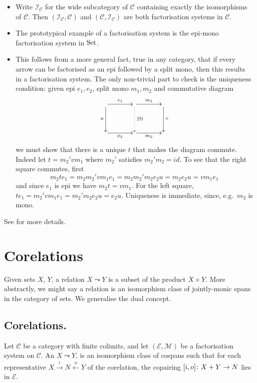 \begin{examples}
  \begin{itemize}
    \item Write $\mathcal I_{\mathcal C}$ for the wide subcategory of $\mathcal
      C$ containing exactly the isomorphisms of $\mathcal C$. Then $(\mathcal
      I_{\mathcal C}, \mathcal C)$ and $(\mathcal C, \mathcal I_{\mathcal C})$
      are both factorisation systems in $\mathcal C$. 
    
    \item The prototypical example of a factorisation system is the epi-mono
  factorisation system in $\mathrm{Set}$.

    \item This follows from a more general fact, true in any category, that if every arrow can be factorised
as an epi followed by a split mono, then this results in a factorisation system.
The only non-trivial part to check is the uniqueness condition: given epi $e_1,e_2$, 
split mono $m_1,m_2$ and commutative diagram
    \[
      \xymatrixcolsep{3pc}
      \xymatrixrowsep{3pc}
      \xymatrix{
  \ar[r]^{e_1} \ar[d]_u & \ar[r]^{m_1} \ar@{.>}[d]^{\exists! t} &  \ar[d]^v \\
  \ar[r]_{e_2}& \ar[r]_{m_2} & 
      }
    \]
we must show that there is a unique $t$ that makes the diagram commute.
Indeed let $t= m_2'vm_1$ where $m_2'$ satisfies $m_2'm_2=id$. 
To see that the right square commutes, first
\[
m_2 t e_1 =  m_2 m_2' v m_1 e_1 = m_2 m_2' m_2 e_2 u = m_2 e_2 u = v m_1 e_1
\]
and since $e_1$ is epi we have $m_2 t = v m_1$. For the left square,
$t e_1 = m_2' v m_1 e_1 = m_2' m_2 e_2 u = e_2 u$. Uniqueness is immediate,
since, e.g.\ $m_2$ is mono. 
\end{itemize}
\end{examples}

See \cite[]{AHS} for more details.

\section{Corelations}

Given sets $X$, $Y$, a relation $X \leadsto Y$ is a subset of the product $X
\times Y$. More abstractly, we might say a relation is an isomorphism class of
jointly-monic spans in the category of sets. We generalise the dual concept.

\subsection{Corelations.}
\begin{definition}
  Let $\mathcal C$ be a category with finite colimits, and let $(\mathcal E,
  \mathcal M)$ be a factorisation system on $\mathcal C$. An  $X \leadsto Y$, is an isomorphism class of cospans
  such that for each representative $X \stackrel{i}\longrightarrow N
  \stackrel{o}\longleftarrow Y$ of the corelation, the copairing $[i,o]{\colon} X+Y
  \to N$ lies in $\mathcal E$.
\end{definition}

